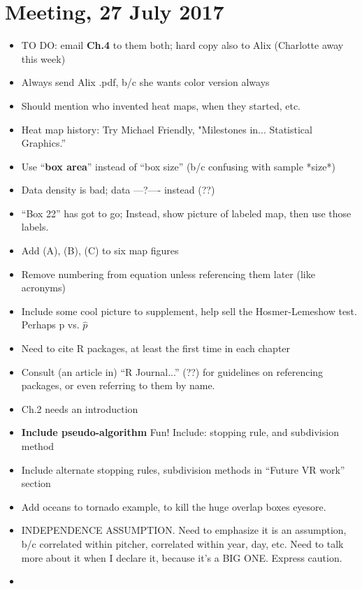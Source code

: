 \documentclass{article}
\begin{document}
\section{Meeting, 27 July 2017}
\begin{itemize}
\item TO DO: email {\bf Ch.4} to them both; hard copy also to Alix (Charlotte away this week)
\item Always send Alix .pdf, b/c she wants color version always
\item Should mention who invented heat maps, when they started, etc. 
\item Heat map history: Try Michael Friendly, "Milestones in... Statistical Graphics.''
\item Use ``{\bf box area}'' instead of ``box size'' (b/c confusing with sample *size*)
\item Data density is bad; data ---?---- instead (??)
\item ``Box 22'' has got to go; Instead, show picture of labeled map, then use those labels.
\item Add (A), (B), (C) to six map figures
\item Remove numbering from equation unless referencing them later (like acronyms)
\item Include some cool picture to supplement, help sell the Hosmer-Lemeshow test. Perhaps p vs. $\hat{p}$
\item Need to cite R packages, at least the first time in each chapter
\item Consult (an article in) ``R Journal...'' (??)  for guidelines on referencing packages, or even referring to them by name.
\item Ch.2 needs an introduction
\item {\bf Include pseudo-algorithm} Fun! Include: stopping rule, and subdivision method
\item Include alternate stopping rules, subdivision methods in ``Future VR work'' section
\item Add oceans to tornado example, to kill the huge overlap boxes eyesore.
\item INDEPENDENCE ASSUMPTION. Need to emphasize it is an assumption, b/c correlated within pitcher, correlated within year, day, etc. Need to talk more about it when I declare it, because it's a BIG ONE. Express caution.
\item
\end{itemize}
\end{document}
